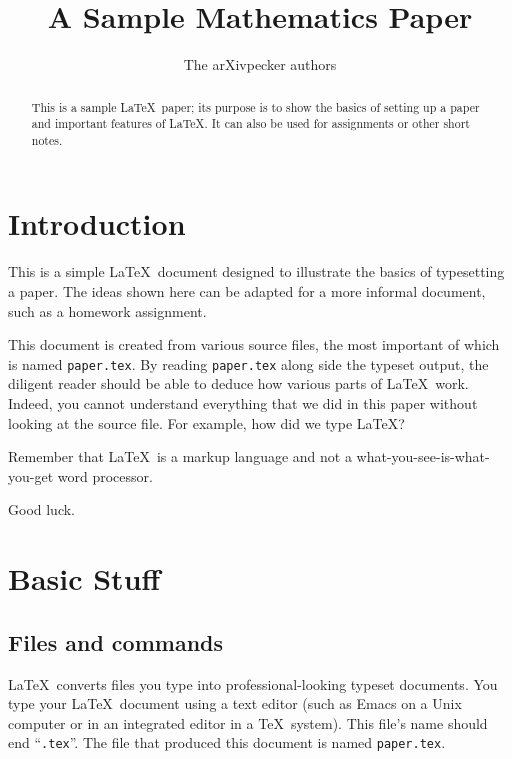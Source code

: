 \documentclass[12pt]{article}
\begin{document}
\nocite{*}

\title{A Sample Mathematics Paper}

\author{The arXivpecker authors}

\maketitle

\begin{abstract}
  This is a sample \LaTeX\ paper; its purpose is to show the basics of
  setting up a paper and important features of \LaTeX. It can also be
  used for assignments or other short notes.
\end{abstract}


\section{Introduction}

This is a simple \LaTeX\ document designed to illustrate the basics of
typesetting a paper. The ideas shown here can be adapted for
a more informal document, such as a homework assignment. 

This document is created from various source files, the most important
of which is named \verb|paper.tex|. By reading \verb|paper.tex| along
side the typeset output, the diligent reader should be able to deduce
how various parts of \LaTeX\ work. Indeed, you cannot understand
everything that we did in this paper without looking at the source
file. For example, how did we type \LaTeX?

Remember that \LaTeX\ is a markup language and not a
what-you-see-is-what-you-get word processor. 

Good luck.

\section{Basic Stuff}
\label{sect:basics}


\subsection{Files and commands}

\LaTeX\ converts files you type into professional-looking typeset
documents. You type your \LaTeX\ document using a text editor (such as
Emacs on a Unix computer or in an integrated editor in a \TeX\
system). This file's name should end ``\verb|.tex|''. The file that
produced this document is named \verb|paper.tex|.
\end{document}
